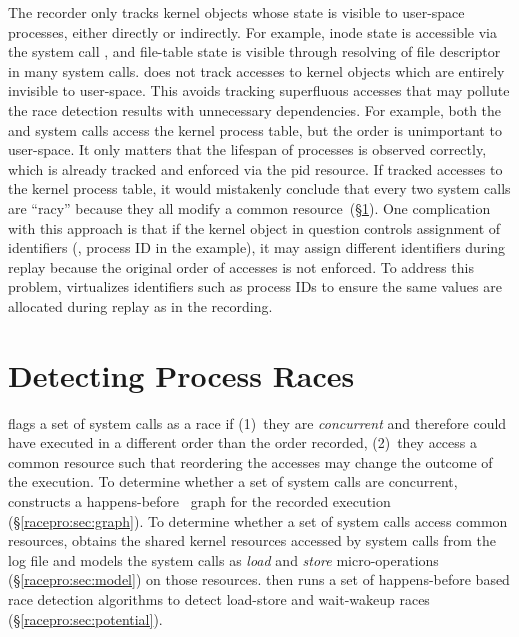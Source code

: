 The recorder only tracks kernel objects whose state is visible
to user-space processes, either directly or indirectly.  For example,
inode state is accessible via the system call , and
file-table state is visible through resolving of file descriptor in
many system calls. \racepro does not track accesses to kernel
objects which are entirely invisible to user-space.
This avoids tracking superfluous
accesses that may pollute the race detection results with unnecessary
dependencies.
For example, both the  and  system calls access the
kernel process table, but the order is unimportant to user-space. It
only matters that the lifespan of processes is observed correctly, 
which is already tracked and enforced via the pid resource.  If \racepro
tracked accesses to the kernel process table, it would mistakenly
conclude that every two  system calls are ``racy'' because they
all modify a common resource~(\S\ref{racepro:sec:detect}).  One complication 
with this approach is that if the kernel object in question controls
assignment of identifiers (\eg, process ID in the  example),
it may assign different identifiers during replay because the original
order of accesses is not enforced. To address this problem, \racepro
virtualizes identifiers such as process IDs to ensure the same values
are allocated during replay as in the recording.

\section{Detecting Process Races} \label{racepro:sec:detect}

\racepro flags a set of system calls as a race if (1)~they are
\emph{concurrent} and therefore could have executed in a different
order than the order recorded, (2)~they access a common resource
such that reordering the accesses may change the outcome of the
execution.  To determine whether a set of system calls are concurrent, 
\racepro constructs a happens-before~\cite{lamportclock} graph for the
recorded execution (\S\ref{racepro:sec:graph}).  To determine whether a set of
system calls access common resources, \racepro obtains the shared kernel
resources accessed by system calls from the log file and models the
system calls as \emph{load} and \emph{store} micro-operations
(\S\ref{racepro:sec:model}) on those resources.  \racepro then runs a set of
happens-before based race detection algorithms to detect load-store
and wait-wakeup races (\S\ref{racepro:sec:potential}).

